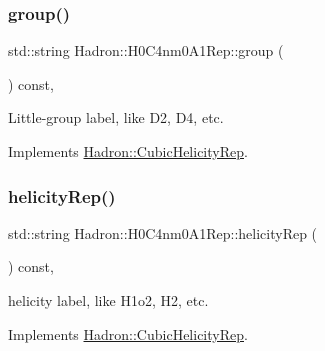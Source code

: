 \mbox{\label{structHadron_1_1H0C4nm0A1Rep_a721e8c07bbc6143cad2cf745771be3f9}} 
\subsubsection{\texorpdfstring{group()}{group()}\hspace{0.1cm}{\footnotesize\ttfamily [5/5]}}
{\footnotesize\ttfamily std\+::string Hadron\+::\+H0\+C4nm0\+A1\+Rep\+::group (\begin{DoxyParamCaption}{ }\end{DoxyParamCaption}) const\hspace{0.3cm}{\ttfamily [inline]}, {\ttfamily [virtual]}}

Little-\/group label, like D2, D4, etc. 

Implements \mbox{\hyperlink{structHadron_1_1CubicHelicityRep_a101a7d76cd8ccdad0f272db44b766113}{Hadron\+::\+Cubic\+Helicity\+Rep}}.

\mbox{\label{structHadron_1_1H0C4nm0A1Rep_a2c5a6923713010a76a5139a03ae879cf}} 
\subsubsection{\texorpdfstring{helicityRep()}{helicityRep()}\hspace{0.1cm}{\footnotesize\ttfamily [1/3]}}
{\footnotesize\ttfamily std\+::string Hadron\+::\+H0\+C4nm0\+A1\+Rep\+::helicity\+Rep (\begin{DoxyParamCaption}{ }\end{DoxyParamCaption}) const\hspace{0.3cm}{\ttfamily [inline]}, {\ttfamily [virtual]}}

helicity label, like H1o2, H2, etc. 

Implements \mbox{\hyperlink{structHadron_1_1CubicHelicityRep_af1096946b7470edf0a55451cc662f231}{Hadron\+::\+Cubic\+Helicity\+Rep}}.

\mbox{\label{structHadron_1_1H0C4nm0A1Rep_a2c5a6923713010a76a5139a03ae879cf}} 
